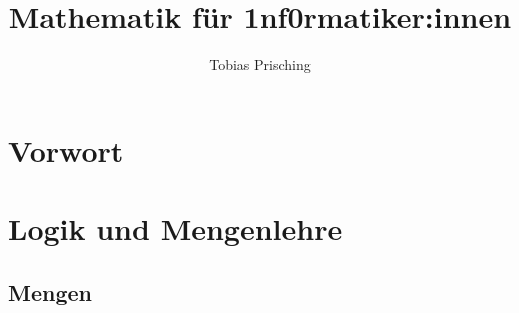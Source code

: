 \documentclass[a4paper,12pt,ngerman]{scrreprt}
\title{Mathematik für 1nf0rmatiker:innen}
\author{Tobias Prisching}
\date{ }
\theoremstyle{definition}
\begin{document}
	
	\maketitle
	
	\newpage

	\tableofcontents

	\newpage
	\chapter*{Vorwort}\label{Vorwort}
	
	
	\newpage
	\chapter{Logik und Mengenlehre}\label{L&M}

		\section{Mengen}\label{L&M:Mengen}
			
	
\end{document}
